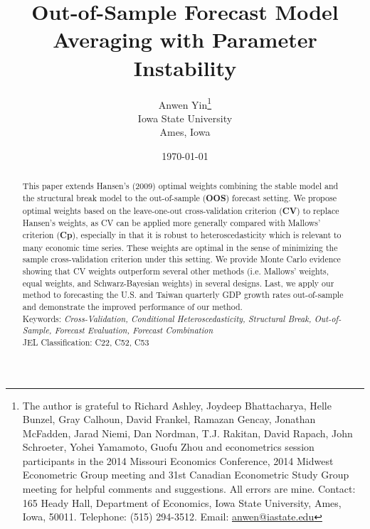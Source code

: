 
\title{Out-of-Sample Forecast Model Averaging with Parameter Instability}
\author{Anwen Yin\thanks{The author is grateful to Richard Ashley, Joydeep Bhattacharya, Helle Bunzel, Gray Calhoun, David Frankel, Ramazan Gencay, Jonathan McFadden, Jarad Niemi, Dan Nordman, T.J. Rakitan, David Rapach, John Schroeter, Yohei Yamamoto, Guofu Zhou and econometrics session participants in the 2014 Missouri Economics Conference, 2014 Midwest Econometric Group meeting and 31st Canadian Econometric Study Group meeting for helpful comments and suggestions. All errors are mine. Contact: 165 Heady Hall, Department of Economics, Iowa State University, Ames, Iowa, 50011. Telephone: (515) 294-3512. Email: \href{mailto:anwen@iastate.edu}{anwen@iastate.edu}} \\ Iowa State University\\Ames, Iowa}
\date{\today}

\maketitle

\begin{abstract}
  \noindent This paper extends Hansen's (2009) optimal weights combining the stable model and the structural break model to the out-of-sample (\textbf{OOS}) forecast setting. We propose optimal weights based on the leave-one-out cross-validation criterion (\textbf{CV}) to replace Hansen's weights, as CV can be applied more generally compared with Mallows' criterion (\textbf{Cp}), especially in that it is robust to heteroscedasticity which is relevant to many economic time series. These weights are optimal in the sense of minimizing the sample cross-validation criterion under this setting. We provide Monte Carlo evidence showing that CV weights outperform several other methods (i.e. Mallows' weights, equal weights, and Schwarz-Bayesian weights) in several designs. Last, we apply our method to forecasting the U.S. and Taiwan quarterly GDP growth rates out-of-sample and demonstrate the improved performance of our method.\\

  \noindent Keywords: \emph{Cross-Validation, Conditional Heteroscedasticity, Structural Break, Out-of-Sample, Forecast Evaluation, Forecast Combination}\\

  \noindent \textsc{JEL} Classification: C22, C52, C53
\end{abstract}
\newpage
\doublespacing
